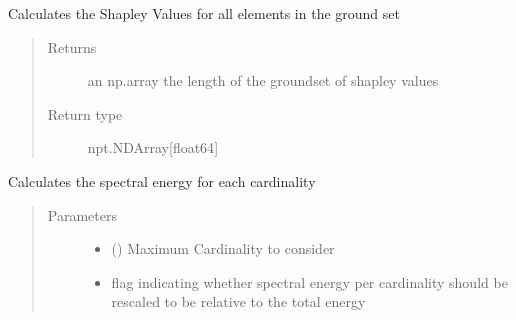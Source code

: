 \documentclass[letterpaper,10pt,english]{sphinxmanual}
\begin{document}
\begin{fulllineitems}

\begin{fulllineitems}
\label{\detokenize{setFTs:setFTs.setfunctions.SparseDSFTFunction.shapley_values}}
\sphinxAtStartPar
Calculates the Shapley Values for all elements in the ground set
\begin{quote}\begin{description}
\item[{Returns}] \leavevmode
\sphinxAtStartPar
an np.array the length of the groundset of shapley values

\item[{Return type}] \leavevmode
\sphinxAtStartPar
npt.NDArray{[}float64{]}

\end{description}\end{quote}

\end{fulllineitems}


\begin{fulllineitems}
\label{\detokenize{setFTs:setFTs.setfunctions.SparseDSFTFunction.spectral_energy}}
\sphinxAtStartPar
Calculates the spectral energy for each cardinality
\begin{quote}\begin{description}
\item[{Parameters}] \leavevmode\begin{itemize}
\item {} 
\sphinxAtStartPar
{} () \textendash{} Maximum Cardinality to consider

\item {} 
\sphinxAtStartPar
{} \textendash{} flag indicating whether spectral energy per cardinality
should be rescaled to be relative to the total energy


\end{itemize}
\end{description}
\end{quote}
\end{fulllineitems}
\end{fulllineitems}
\end{document}
